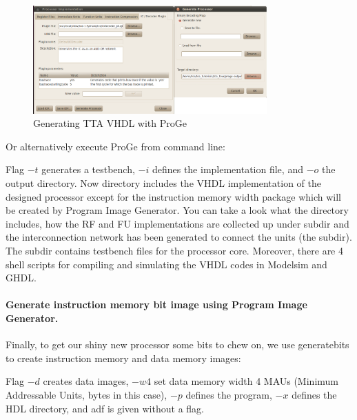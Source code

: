 \documentclass[twoside]{tceusermanual}
\begin{document}
\begin{figure}
  \begin{center} \includegraphics[width=0.8\textwidth]{eps/proge_scrshot}
  \caption{Generating TTA VHDL with ProGe} 
  \label{fig:proge} \end{center}
\end{figure}


Or alternatively execute ProGe from command line:


Flag $-t$ generates a testbench, $-i$ defines the implementation file,
and $-o$ the output directory.  Now directory 
includes the VHDL implementation of the designed processor except for
the instruction memory width package which will be created by Program
Image Generator. You can take a look what the directory includes, how
the RF and FU implementations are collected up under
 subdir and the interconnection network has been generated to
connect the units (the  subdir). The  subdir
contains testbench files for the processor core. Moreover, there are 4
shell scripts for compiling and simulating the VHDL codes in Modelsim
and GHDL.

\paragraph{Generate instruction memory bit image using Program Image Generator.}

Finally, to get our shiny new processor some bits to chew on,
we use generatebits to create instruction memory and data memory images:


Flag $-d$ creates data images, $-w 4$ set data memory width 4 MAUs
(Minimum Addressable Units, bytes in this case), $-p$ defines the
program, $-x$ defines the HDL directory, and adf is given without a
flag.
\end{document}
